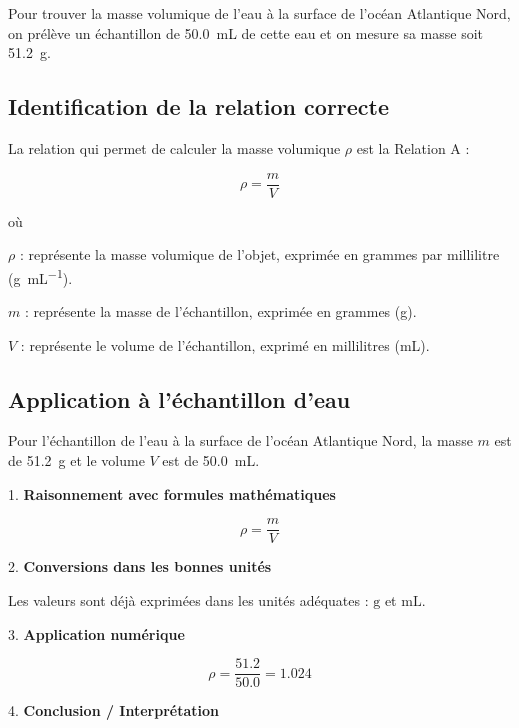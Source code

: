\documentclass[answers]{exam}
\begin{document}
\begin{questions}
  Pour trouver la masse volumique de l’eau à la surface de l’océan Atlantique Nord, on prélève un échantillon de \SI{50.0}{\milli\liter} de cette eau et on mesure sa masse soit \SI{51.2}{\gram}.
  
  

\begin{solution}
\subsection*{Identification de la relation correcte}

La relation qui permet de calculer la masse volumique $\rho$ est la Relation A :

\[
\rho = \frac{m}{V}
\]

où 

\begin{addmargin}[4em]{1em}
  \begin{compactitem}
    \item [$\rho$]: représente la masse volumique de l'objet, exprimée en grammes par millilitre (\si{\gram\per\milli\liter}).
    \item [$m$]: représente la masse de l'échantillon, exprimée en grammes (\si{\gram}).
    \item [$V$]: représente le volume de l'échantillon, exprimé en millilitres (\si{\milli\liter}).
  \end{compactitem}
\end{addmargin}

\subsection*{Application à l'échantillon d'eau}

Pour l'échantillon de l'eau à la surface de l’océan Atlantique Nord, la masse $m$ est de \SI{51.2}{\gram} et le volume $V$ est de \SI{50.0}{\milli\liter}.

1. \textbf{Raisonnement avec formules mathématiques}

\[
\rho = \frac{m}{V}
\]

2. \textbf{Conversions dans les bonnes unités}

Les valeurs sont déjà exprimées dans les unités adéquates : $\si{\gram}$ et $\si{\milli\liter}$.

3. \textbf{Application numérique}

\[
\rho = \frac{51.2}{50.0} = 1.024
\]

4. \textbf{Conclusion / Interprétation}


\end{solution}
\end{questions}
\end{document}
